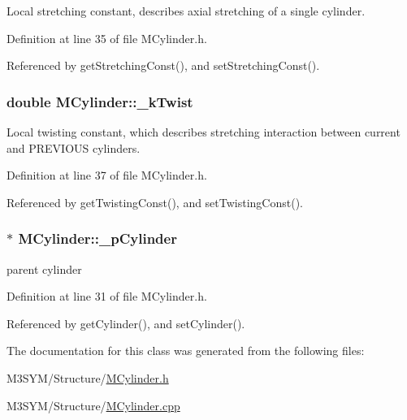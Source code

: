 Local stretching constant, describes axial stretching of a single cylinder. 



Definition at line 35 of file M\+Cylinder.\+h.



Referenced by get\+Stretching\+Const(), and set\+Stretching\+Const().

\hypertarget{classMCylinder_a411d5b040058afae90b54438f930cfc9}{
\subsubsection[{\+\_\+k\+Twist}]{\setlength{\rightskip}{0pt plus 5cm}double M\+Cylinder\+::\+\_\+k\+Twist\hspace{0.3cm}{\ttfamily [private]}}}\label{classMCylinder_a411d5b040058afae90b54438f930cfc9}


Local twisting constant, which describes stretching interaction between current and P\+R\+E\+V\+I\+O\+U\+S cylinders. 



Definition at line 37 of file M\+Cylinder.\+h.



Referenced by get\+Twisting\+Const(), and set\+Twisting\+Const().

\hypertarget{classMCylinder_ae7264ecc5bc382231f37821347db7f82}{
\subsubsection[{\+\_\+p\+Cylinder}]{$\ast$ M\+Cylinder\+::\+\_\+p\+Cylinder\hspace{0.3cm}{\ttfamily [private]}}}\label{classMCylinder_ae7264ecc5bc382231f37821347db7f82}


parent cylinder 



Definition at line 31 of file M\+Cylinder.\+h.



Referenced by get\+Cylinder(), and set\+Cylinder().



The documentation for this class was generated from the following files\+:\begin{DoxyCompactItemize}
\item 
M3\+S\+Y\+M/\+Structure/\hyperlink{MCylinder_8h}{M\+Cylinder.\+h}\item 
M3\+S\+Y\+M/\+Structure/\hyperlink{MCylinder_8cpp}{M\+Cylinder.\+cpp}\end{DoxyCompactItemize}
